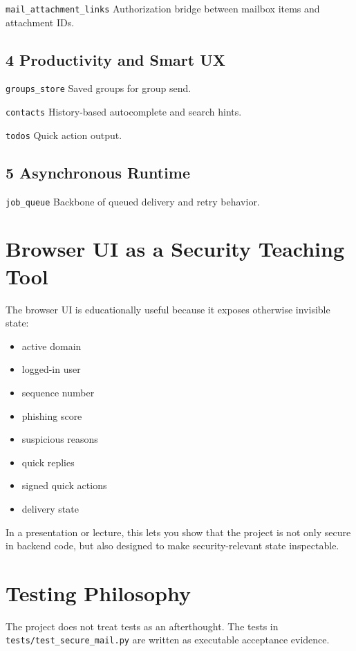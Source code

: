 \documentclass[11pt,a4paper]{article}
\begin{document}
\nolinkurl{mail_attachment_links} Authorization bridge between mailbox items and attachment IDs.

\subsection{4 Productivity and Smart UX}

\nolinkurl{groups_store} Saved groups for group send.

\nolinkurl{contacts} History-based autocomplete and search hints.

\nolinkurl{todos} Quick action output.

\subsection{5 Asynchronous Runtime}

\nolinkurl{job_queue} Backbone of queued delivery and retry behavior.


\section{Browser UI as a Security Teaching Tool}

The browser UI is educationally useful because it exposes otherwise invisible state:

\begin{itemize}
\item active domain
\item logged-in user
\item sequence number
\item phishing score
\item suspicious reasons
\item quick replies
\item signed quick actions
\item delivery state
\end{itemize}

In a presentation or lecture, this lets you show that the project is not only secure in backend code, but also designed to make security-relevant state inspectable.


\section{Testing Philosophy}

The project does not treat tests as an afterthought. The tests in \nolinkurl{tests/test_secure_mail.py} are written as executable acceptance evidence.
\end{document}
